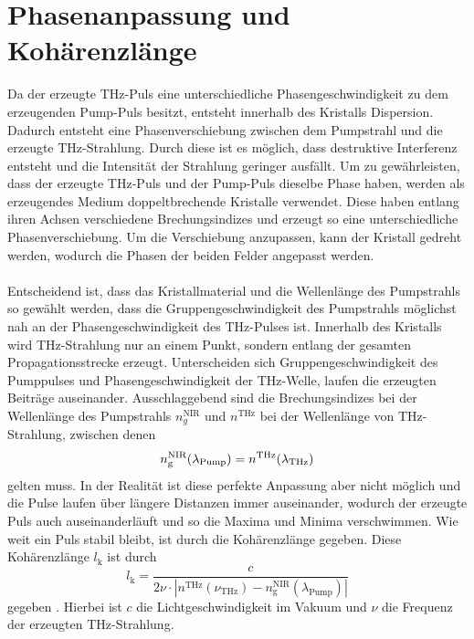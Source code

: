 \section{Phasenanpassung und Kohärenzlänge}
\label{sec:PA}
Da der erzeugte THz-Puls eine unterschiedliche Phasengeschwindigkeit zu dem erzeugenden Pump-Puls besitzt, entsteht innerhalb des Kristalls Dispersion. 
Dadurch entsteht eine Phasenverschiebung zwischen dem Pumpstrahl und die erzeugte THz-Strahlung. 
Durch diese ist es möglich, dass destruktive Interferenz entsteht und die Intensität der Strahlung 
geringer ausfällt. 
Um zu gewährleisten, dass der erzeugte THz-Puls und der Pump-Puls dieselbe Phase haben, 
werden als erzeugendes Medium doppeltbrechende Kristalle verwendet. 
Diese haben entlang ihren Achsen verschiedene Brechungsindizes und erzeugt so eine unterschiedliche 
Phasenverschiebung. 
Um die Verschiebung anzupassen, kann der Kristall gedreht werden, wodurch die Phasen 
der beiden Felder angepasst werden. \\ \\
Entscheidend ist, dass das Kristallmaterial und die 
Wellenlänge des Pumpstrahls so gewählt werden, dass die Gruppengeschwindigkeit des 
Pumpstrahls möglichst nah an der Phasengeschwindigkeit des THz-Pulses ist. 
Innerhalb des Kristalls wird THz-Strahlung nur an einem Punkt, 
sondern entlang der gesamten Propagationsstrecke erzeugt. 
Unterscheiden sich Gruppengeschwindigkeit des Pumppulses und Phasengeschwindigkeit der THz-Welle, 
laufen die erzeugten Beiträge auseinander.
Ausschlaggebend sind die Brechungsindizes bei der Wellenlänge des Pumpstrahls $n_g^\text{NIR}$ 
und $n^\text{THz}$ bei der Wellenlänge von THz-Strahlung, zwischen denen  
\begin{equation}
    \label{eqn:brech}
    n_\text g^\text{NIR}(\lambda_\text{Pump})= n^\text{THz}(\lambda_\text{THz})
\end{equation}
gelten muss. In der Realität ist diese perfekte Anpassung aber nicht möglich und 
die Pulse laufen über längere Distanzen immer auseinander, wodurch der erzeugte Puls auch 
auseinanderläuft und so die Maxima und Minima verschwimmen. 
Wie weit ein Puls stabil bleibt, ist durch die Kohärenzlänge gegeben.
Diese Kohärenzlänge $l_\text{k}$ ist durch 
\begin{equation}
    \label{eqn:koh}
     l_\text{k}= \frac{c}{2\nu\cdot |n^\text{THz}(\nu_\text{THz})-n^\text{NIR}_\text{g}(\lambda_\text{Pump})| }
\end{equation}
gegeben \cite{brunner2014thz}.
Hierbei ist $c$ die Lichtgeschwindigkeit im Vakuum und $\nu$ die Frequenz der erzeugten THz-Strahlung.


